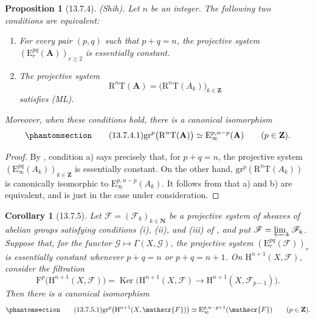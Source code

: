 \documentclass[oneside]{amsart}
\theoremstyle{ega-env-style}
\theoremstyle{ega-thm-env-style}
\newtheorem*{proposition}{Proposition}
\newtheorem*{corollary}{Corollary}
\theoremstyle{ega-defn-env-style}
\def\mathcal{\mathscr}
\def\sh{\mathcal}                   %
\def\bb{\mathbf}                    %
\def\geq{\geqslant}                 %
\def\HH{\mathrm{H}}                 %
\def\RR{\mathrm{R}}                 %
\def\Ker{\operatorname{Ker}}
\def\isoto{\simeq} %
\let\EGAOriginalLabel\label
\renewcommand{\label}[1]{\phantomsection\EGAOriginalLabel{#1}}
\begin{document}
\begin{proposition}[13.7.4]
\label{0.13.7.4}
\emph{(Shih).}
Let $n$ be an integer.
The following two conditions are equivalent:
\begin{enumerate}
  \item[{\rm a)}] For every pair $(p,q)$ such that $p+q=n$, the
  projective system
  $(\mathrm{E}_r^{pq}(\bb{A}))_{r\geq2}$ is essentially constant.
  \item[{\rm b)}] The projective system
  \[
    \RR^n\mathrm{T}(\bb{A})
    =
    \bigl(\RR^n\mathrm{T}(A_k)\bigr)_{k\in\bb{Z}}
  \]
  satisfies {\rm(ML)}.
\end{enumerate}
Moreover, when these conditions hold, there is a canonical
isomorphism
\begin{equation}
\label{0.13.7.4.1}
\tag{13.7.4.1}
  \mathrm{gr}^p\bigl(\RR^n\mathrm{T}(\bb{A})\bigr)
  \isoto
  \mathrm{E}_\infty^{p,n-p}(\bb{A})
  \qquad(p\in\bb{Z}).
\end{equation}
\end{proposition}

\begin{proof}
By , condition {\rm a)} says precisely that, for
$p+q=n$, the projective system
$(\mathrm{E}_\infty^{pq}(A_k))_{k\in\bb{Z}}$ is essentially
constant.
On the other hand,
$\mathrm{gr}^p(\RR^n\mathrm{T}(A_k))$ is canonically isomorphic to
$\mathrm{E}_\infty^{p,n-p}(A_k)$.
It follows from  that {\rm a)} and {\rm b)} are
equivalent, and  is just
 in the case under consideration.
\end{proof}

\begin{corollary}[13.7.5]
\label{0.13.7.5}
Let $\sh{F}=(\sh{F}_k)_{k\in\bb{N}}$ be a projective system of
sheaves of abelian groups satisfying conditions {\rm(i)}, {\rm(ii)},
and {\rm(iii)} of , and put
$\sh{F}=\varprojlim_k\sh{F}_k$.
Suppose that, for the functor
$\sh{G}\longmapsto\Gamma(X,\sh{G})$, the projective system
$(\mathrm{E}_r^{pq}(\sh{F}))_r$ is essentially constant whenever
$p+q=n$ or $p+q=n+1$.
On $\HH^{n+1}(X,\sh{F})$, consider the filtration
\[
  \mathrm{F}^p\bigl(\HH^{n+1}(X,\sh{F})\bigr)
  =
  \Ker\bigl(
    \HH^{n+1}(X,\sh{F})
    \longrightarrow
    \HH^{n+1}(X,\sh{F}_{p-1})
  \bigr).
\]
Then there is a canonical isomorphism
\begin{equation}
\label{0.13.7.5.1}
\tag{13.7.5.1}
  \mathrm{gr}^p\bigl(\HH^{n+1}(X,\sh{F})\bigr)
  \isoto
  \mathrm{E}_\infty^{p,n-p+1}(\sh{F})
  \qquad(p\in\bb{Z}).
\end{equation}
\end{corollary}
\end{document}
